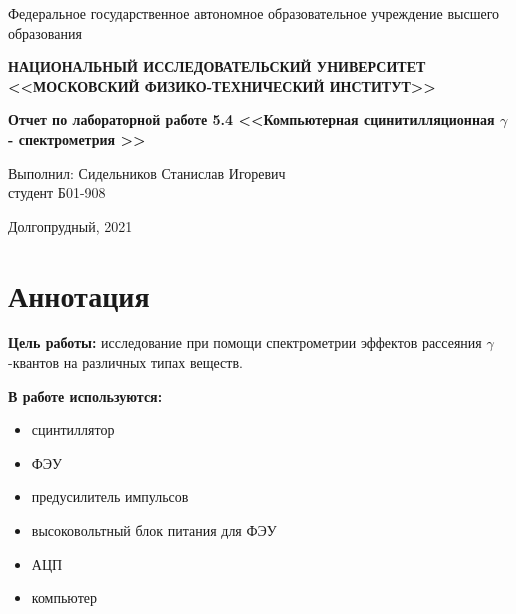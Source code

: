 
\usepackage{adjustbox}


\begin{center}
    
    \normalsize{Федеральное государственное автономное образовательное учреждение высшего образования}
    
    \textbf{НАЦИОНАЛЬНЫЙ ИССЛЕДОВАТЕЛЬСКИЙ УНИВЕРСИТЕТ \\ <<МОСКОВСКИЙ ФИЗИКО-ТЕХНИЧЕСКИЙ ИНСТИТУТ>>}
    \vspace{13ex}
    
    \textbf{Отчет по лабораторной работе 5.4 <<Компьютерная сцинитилляционная $\gamma$ - спектрометрия >> }
    
    \vspace{40ex}
\end{center}
\begin{flushright}
    \normalsize{Выполнил: Сидельников Станислав Игоревич \\ студент Б01-908\\}
\end{flushright}
    
\vfill
    
\begin{center}
Долгопрудный, 2021
\end{center}

\thispagestyle{empty} %

\newpage
	\section{Аннотация}
	
	\textbf{Цель работы:} исследование при помощи спектрометрии
						  эффектов рассеяния $\gamma$-квантов на различных типах веществ. 
	
	
	\textbf{В работе используются:}
	
	\begin{itemize}
		
		\item сцинтиллятор
		\item ФЭУ
		\item предусилитель импульсов
		\item высоковольтный блок питания для ФЭУ
		\item АЦП
		\item компьютер
		
	\end{itemize}
	
